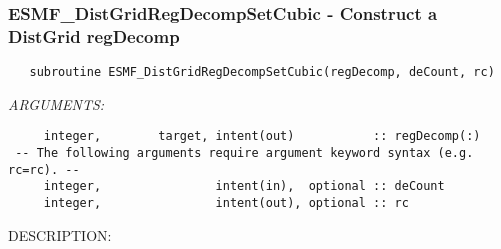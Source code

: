  
\setlength{\oldparskip}{\parskip}
\setlength{\parskip}{1.5ex}
\setlength{\oldparindent}{\parindent}
\setlength{\parindent}{0pt}
\setlength{\oldbaselineskip}{\baselineskip}
\setlength{\baselineskip}{11pt}
 
\def\bv{\begin{verbatim}}
\def\ev{\end{verbatim}}
\def\be{\begin{equation}}
\def\ee{\end{equation}}
\def\bea{\begin{eqnarray}}
\def\eea{\end{eqnarray}}
\def\bi{\begin{itemize}}
\def\ei{\end{itemize}}
\def\bn{\begin{enumerate}}
\def\en{\end{enumerate}}
\def\bd{\begin{description}}
\def\ed{\end{description}}
\def\({\left (}
\def\){\right )}
\def\[{\left [}
\def\]{\right ]}
\def\<{\left  \langle}
\def\>{\right \rangle}
\def\cI{{\cal I}}
\def\diag{\mathop{\rm diag}}
\def\tr{\mathop{\rm tr}}


 
\subsubsection [ESMF\_DistGridRegDecompSetCubic] {ESMF\_DistGridRegDecompSetCubic - Construct a DistGrid regDecomp}


\begin{verbatim}   subroutine ESMF_DistGridRegDecompSetCubic(regDecomp, deCount, rc)\end{verbatim}{\em ARGUMENTS:}
\begin{verbatim}     integer,        target, intent(out)           :: regDecomp(:)
 -- The following arguments require argument keyword syntax (e.g. rc=rc). --
     integer,                intent(in),  optional :: deCount
     integer,                intent(out), optional :: rc\end{verbatim}
{\sf DESCRIPTION:\\ }


